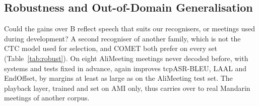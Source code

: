 \subsection{Robustness and Out-of-Domain Generalisation}
\label{sec:res-robust}

Could the gains over B reflect speech that suits our recognisers, or meetings used during development? A second
recogniser of another family, which is not the CTC model used for selection, and COMET both prefer \sys{} on every set
(Table~\ref{tab:robust}). On eight AliMeeting meetings never decoded before, with systems and tests fixed in advance,
\sys{} again improves tcpASR-BLEU, LAAL and EndOffset, by margins at least as large as on the AliMeeting test set. The
playback layer, trained and set on AMI only, thus carries over to real Mandarin meetings of another corpus.
